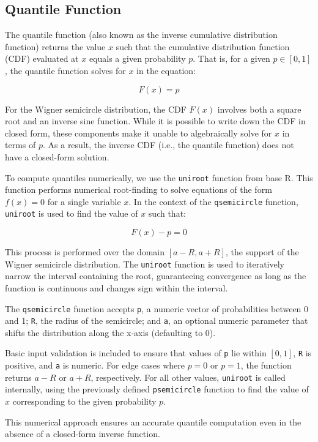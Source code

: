 \documentclass[11pt]{asaproc}
\begin{document}
\subsection{Quantile Function}

The quantile function (also known as the inverse cumulative distribution function)
returns the value $x$ such that the cumulative distribution function (CDF) evaluated at $x$
equals a given probability $p$. That is, for a given $p \in [0,1]$, the quantile function
solves for $x$ in the equation:

\[
F(x) = p
\]

For the Wigner semicircle distribution, the CDF $F(x)$ involves both a square root and an inverse sine function. While it is possible to write down the CDF in closed form, these components make it unable to algebraically solve for $x$ in terms of $p$. As a result, the inverse CDF (i.e., the quantile function) does not have a closed-form solution.

To compute quantiles numerically, we use the \texttt{uniroot} function from base R. This function performs numerical root-finding to solve equations of the form $f(x) = 0$ for a single variable $x$. In the context of the \texttt{qsemicircle} function, \texttt{uniroot} is used to find the value of $x$ such that:

\[
F(x) - p = 0
\]

This process is performed over the domain $[a - R, a + R]$, the support of the Wigner semicircle distribution. The \texttt{uniroot} function is used to iteratively narrow the interval containing the root, guaranteeing convergence as long as the function is continuous and changes sign within the interval.

The \texttt{qsemicircle} function accepts \texttt{p}, a numeric vector of probabilities between 0 and 1; \texttt{R}, the radius of the semicircle; and \texttt{a}, an optional numeric parameter that shifts the distribution along the x-axis (defaulting to 0).

Basic input validation is included to ensure that values of \texttt{p} lie within $[0, 1]$, \texttt{R} is positive, and \texttt{a} is numeric. For edge cases where $p = 0$ or $p = 1$, the function returns $a - R$ or $a + R$, respectively. For all other values, \texttt{uniroot} is called internally, using the previously defined \texttt{psemicircle} function to find the value of $x$ corresponding to the given probability $p$.

This numerical approach ensures an accurate quantile computation even in the absence of a closed-form inverse function.
\end{document}
